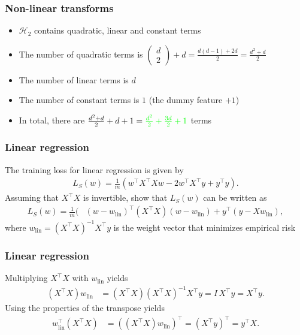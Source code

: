 \documentclass[10pt]{beamer}
\begin{document}
\begin{frame}
  \frametitle{Non-linear transforms}
  \begin{itemize}
  \item $\mathcal{H}_2$ contains {\color{red} quadratic}, {\color{red} linear} and {\color{red} constant} terms
  \pause
  \item The number of quadratic terms is $\left( \begin{array}{c} d\\ 2 \end{array} \right) + d = \frac {d(d-1)+2d} 2 = \frac{d^2 + d} 2$
  \pause
  \item The number of linear terms is $d$
  \pause
  \item The number of constant terms is $1$ (the dummy feature $+1$)
  \pause
  \item In total, there are $\frac{d^2 + d} 2 + d + 1 = {\color{green} \frac {d^2} 2 + \frac {3d} 2 + 1}$ terms
  \end{itemize}
\end{frame}

\begin{frame}
  \frametitle{Linear regression}
	The training loss for linear regression is given by
  \begin{align}
	L_S(w)=\frac 1 m (w^\top X^\top X w - 2 w^\top X^\top y + y^\top y).
  \end{align}
	Assuming that $X^\top X$ is invertible, show that $L_S(w)$ can be written as
  \begin{align}
	L_S(w) = \frac 1 m (&(w - w_{\mathrm{lin}})^\top (X^\top X)(w - w_{\mathrm{lin}}) + y^\top (y - Xw_{\mathrm{lin}}),
  \end{align}
	where $w_{\mathrm{lin}} = (X^\top X)^{-1}X^\top y$ is the weight vector that minimizes empirical risk
\end{frame}

\begin{frame}
  \frametitle{Linear regression}
  Multiplying $X^\top X$ with $w_{\mathrm{lin}}$ yields
  \begin{align*}
	(X^\top X)w_{\mathrm{lin}} &= (X^\top X)(X^\top X)^{-1}X^\top y = I\,X^\top y = X^\top y.
  \end{align*}
  Using the properties of the transpose yields
  \begin{align*}
	w_{\mathrm{lin}}^\top(X^\top X) &= ((X^\top X)w_{\mathrm{lin}})^\top = (X^\top y)^\top = y^\top X.
  \end{align*}
\end{frame}
\end{document}
